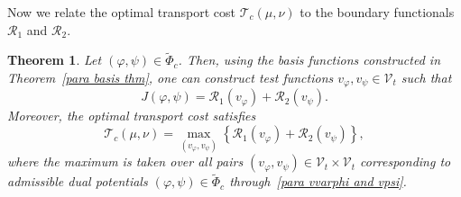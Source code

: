 \documentclass[12pt]{amsart}
\renewcommand{\Re}{\operatorname{Re}}
\newtheorem{thm}{Theorem}
\newtheorem{remark}{Remark}
\begin{document}

Now we relate the optimal transport cost \(\mathcal{T}_c(\mu,\nu)\) to the boundary functionals \(\mathcal{R}_1\) and \(\mathcal{R}_2\).

\begin{thm}\label{para two v thm}
Let \( (\varphi, \psi) \in \widetilde{\Phi}_c \). Then, using the basis functions constructed in Theorem~\ref{para basis thm}, one can construct test functions \( v_\varphi, v_\psi \in \mathcal{V}_t \) such that
\begin{equation}\label{para vvarphi and vpsi}
    J(\varphi, \psi) = \mathcal{R}_1(v_\varphi) + \mathcal{R}_2(v_\psi).
\end{equation}
Moreover, the optimal transport cost satisfies
\begin{equation}\label{para v and cost}
    \mathcal{T}_c(\mu, \nu) = \max_{(v_\varphi, v_\psi)} 
        \left\{ \mathcal{R}_1(v_\varphi) + \mathcal{R}_2(v_\psi) \right\},
\end{equation}
where the maximum is taken over all pairs \( (v_\varphi, v_\psi) \in \mathcal{V}_t \times \mathcal{V}_t \) corresponding to admissible dual potentials \( (\varphi, \psi) \in \widetilde{\Phi}_c \) through~\eqref{para vvarphi and vpsi}.
\end{thm}
\end{document}
